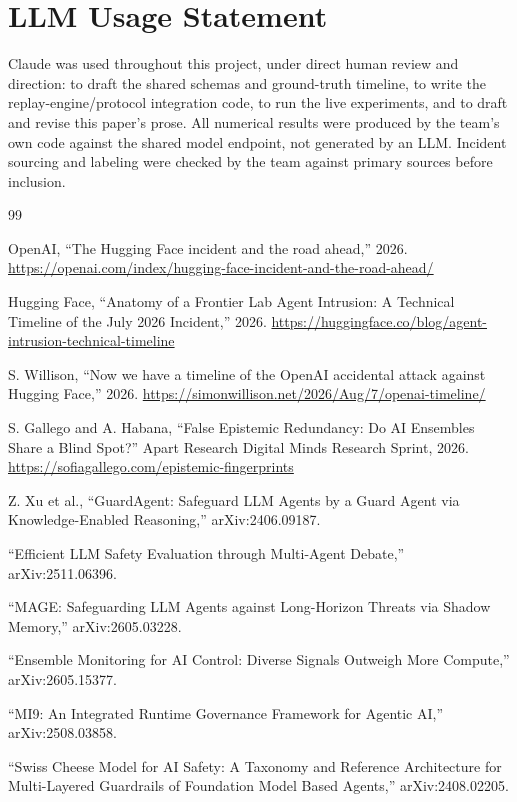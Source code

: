 \documentclass[11pt]{article}
\begin{document}
\section*{LLM Usage Statement}

Claude was used throughout this project, under direct human review and
direction: to draft the shared schemas and ground-truth timeline, to write the
replay-engine/protocol integration code, to run the live experiments, and
to draft and revise this paper's prose. All numerical results were
produced by the team's own code against the shared model endpoint, not
generated by an LLM. Incident sourcing and labeling were checked by the
team against primary sources before inclusion.


\begin{thebibliography}{99}

 OpenAI, ``The Hugging Face incident and the road
ahead,'' 2026. \url{https://openai.com/index/hugging-face-incident-and-the-road-ahead/}

 Hugging Face, ``Anatomy of a Frontier Lab Agent
Intrusion: A Technical Timeline of the July 2026 Incident,'' 2026.
\url{https://huggingface.co/blog/agent-intrusion-technical-timeline}

 S. Willison, ``Now we have a timeline of the
OpenAI accidental attack against Hugging Face,'' 2026.
\url{https://simonwillison.net/2026/Aug/7/openai-timeline/}

 S. Gallego and A. Habana, ``False
Epistemic Redundancy: Do AI Ensembles Share a Blind Spot?'' Apart Research
Digital Minds Research Sprint, 2026.
\url{https://sofiagallego.com/epistemic-fingerprints}

 Z. Xu et al., ``GuardAgent: Safeguard LLM Agents by a
Guard Agent via Knowledge-Enabled Reasoning,'' arXiv:2406.09187.

 ``Efficient LLM Safety Evaluation through
Multi-Agent Debate,'' arXiv:2511.06396.

 ``MAGE: Safeguarding LLM Agents against Long-Horizon Threats
via Shadow Memory,'' arXiv:2605.03228.

 ``Ensemble Monitoring for AI Control: Diverse
Signals Outweigh More Compute,'' arXiv:2605.15377.

 ``MI9: An Integrated Runtime Governance Framework for Agentic
AI,'' arXiv:2508.03858.

 ``Swiss Cheese Model for AI Safety: A Taxonomy and
Reference Architecture for Multi-Layered Guardrails of Foundation Model
Based Agents,'' arXiv:2408.02205.

\end{thebibliography}
\end{document}
